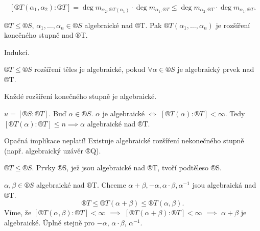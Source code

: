 \documentclass[12pt]{article}                   %
\begin{document}
        \begin{dusledek}
            $$ [®T(\alpha_1, \alpha_2):®T] = \deg m_{\alpha_2, ®T(\alpha_1)} · \deg m_{\alpha_1, ®T} ≤ \deg m_{\alpha_2, ®T} · \deg m_{\alpha_1, ®T}. $$
        \end{dusledek}

        \begin{dusledek}
                $®T ≤ ®S$, $\alpha_1, …, \alpha_n \in ®S$ algebraické nad ®T. Pak $®T(\alpha_1, …, \alpha_n)$ je rozšíření konečného stupně nad ®T.

            \begin{dukazin}
                Indukcí.
            \end{dukazin}
        \end{dusledek}

        \begin{definice}
            $®T ≤ ®S$ rozšíření těles je algebraické, pokud $\forall \alpha \in ®S$ je algebraický prvek nad ®T.
        \end{definice}

        \begin{tvrzeni}
            Každé rozšíření konečného stupně je algebraické.

            \begin{dukazin}
                $u = [®S:®T]$. Buď $\alpha \in ®S$. $\alpha$ je algebraické $\Leftrightarrow$ $[®T(\alpha):®T] < ∞$. Tedy $[®T(\alpha) : ®T] ≤ n \implies \alpha$ algebraické nad ®T.
            \end{dukazin}
        \end{tvrzeni}

        \begin{poznamka}
            Opačná implikace neplatí! Existuje algebraické rozšíření nekonečného stupně (např. algebraický uzávěr ®Q).
        \end{poznamka}

        \begin{veta}
            $®T ≤ ®S$. Prvky ®S, jež jsou algebraické nad ®T, tvoří podtěleso ®S.

            \begin{dukazin}
                $\alpha, \beta \in ®S$ algebraické nad ®T. Chceme $\alpha + \beta, -\alpha, \alpha·\beta, \alpha^{-1}$ jsou algebraická nad ®T.
                $$ ®T ≤ ®T(\alpha + \beta) ≤ ®T(\alpha, \beta). $$
                Víme, že $[®T(\alpha, \beta) : ®T] < ∞$ $\implies$ $[®T(\alpha + \beta) : ®T] < ∞$ $\implies$ $\alpha + \beta$ je algebraické. Úplně stejně pro $-\alpha$, $\alpha·\beta$, $\alpha^{-1}$.
            \end{dukazin}
        \end{veta}
\end{document}
